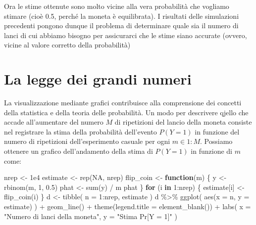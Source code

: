 \documentclass[
  11pt,
]{krantz}
\makeatletter
\newenvironment{Shaded}{\begin{snugshade}}{\end{snugshade}}
\newcommand{\AttributeTok}[1]{\textcolor[rgb]{0.61,0.61,0.61}{#1}}
\newcommand{\ConstantTok}[1]{\textcolor[rgb]{0,0,0}{#1}}
\newcommand{\ControlFlowTok}[1]{\textcolor[rgb]{0.27,0.27,0.27}{\textbf{#1}}}
\newcommand{\DecValTok}[1]{\textcolor[rgb]{0.06,0.06,0.06}{#1}}
\newcommand{\FloatTok}[1]{\textcolor[rgb]{0.06,0.06,0.06}{#1}}
\newcommand{\FunctionTok}[1]{\textcolor[rgb]{0,0,0}{#1}}
\newcommand{\NormalTok}[1]{#1}
\newcommand{\OtherTok}[1]{\textcolor[rgb]{0.37,0.37,0.37}{#1}}
\newcommand{\SpecialCharTok}[1]{\textcolor[rgb]{0,0,0}{#1}}
\newcommand{\StringTok}[1]{\textcolor[rgb]{0.5,0.5,0.5}{#1}}
\newenvironment{kframe}{%
\medskip{}
\setlength{\fboxsep}{.8em}
 \def\at@end@of@kframe{}%
 \ifinner\ifhmode%
  \def\at@end@of@kframe{\end{minipage}}%
  \begin{minipage}{\columnwidth}%
 \fi\fi%
 \def\FrameCommand##1{\hskip\@totalleftmargin \hskip-\fboxsep
 \colorbox{shadecolor}{##1}\hskip-\fboxsep
     \hskip-\linewidth \hskip-\@totalleftmargin \hskip\columnwidth}%
 \MakeFramed {\advance\hsize-\width
   \@totalleftmargin\z@ \linewidth\hsize
   \@setminipage}}%
 {\par\unskip\endMakeFramed%
 \at@end@of@kframe}
\renewenvironment{Shaded}{\begin{kframe}}{\end{kframe}}
\theoremstyle{definition}
\theoremstyle{definition}
\theoremstyle{definition}
\theoremstyle{definition}
\theoremstyle{remark}
\makeatother
\begin{document}
Ora le stime ottenute sono molto vicine alla vera probabilità che vogliamo stimare (cioè 0.5, perché la moneta è equilibrata). I risultati delle simulazioni precedenti pongono dunque il problema di determinare quale sia il numero di lanci di cui abbiamo bisogno per assicurarci che le stime siano accurate (ovvero, vicine al valore corretto della probabilità)

\hypertarget{la-legge-dei-grandi-numeri}{%
\section{La legge dei grandi numeri}\label{la-legge-dei-grandi-numeri}}

La visualizzazione mediante grafici contribuisce alla comprensione dei concetti della statistica e della teoria delle probabilità. Un modo per descrivere qjello che accade all'aumentare del numero \(M\) di ripetizioni del lancio della moneta consiste nel registrare la stima della probabilità dell'evento \(P(Y = 1)\) in funzione del numero di ripetizioni dell'esperimento casuale per ogni \(m \in 1:M\). Possiamo ottenere un grafico dell'andamento della stima di \(P(Y = 1)\) in funzione di \(m\) come:

\begin{Shaded}
\begin{Highlighting}[]
\NormalTok{nrep }\OtherTok{\textless{}{-}} \FloatTok{1e4}
\NormalTok{estimate }\OtherTok{\textless{}{-}} \FunctionTok{rep}\NormalTok{(}\ConstantTok{NA}\NormalTok{, nrep)}
\NormalTok{flip\_coin }\OtherTok{\textless{}{-}} \ControlFlowTok{function}\NormalTok{(m) \{}
\NormalTok{  y }\OtherTok{\textless{}{-}} \FunctionTok{rbinom}\NormalTok{(m, }\DecValTok{1}\NormalTok{, }\FloatTok{0.5}\NormalTok{)}
\NormalTok{  phat }\OtherTok{\textless{}{-}} \FunctionTok{sum}\NormalTok{(y) }\SpecialCharTok{/}\NormalTok{ m}
\NormalTok{  phat}
\NormalTok{\}}
\ControlFlowTok{for}\NormalTok{ (i }\ControlFlowTok{in} \DecValTok{1}\SpecialCharTok{:}\NormalTok{nrep) \{}
\NormalTok{  estimate[i] }\OtherTok{\textless{}{-}} \FunctionTok{flip\_coin}\NormalTok{(i)}
\NormalTok{\}}
\NormalTok{d }\OtherTok{\textless{}{-}} \FunctionTok{tibble}\NormalTok{(}
  \AttributeTok{n =} \DecValTok{1}\SpecialCharTok{:}\NormalTok{nrep,}
\NormalTok{  estimate}
\NormalTok{)}
\NormalTok{d }\SpecialCharTok{\%\textgreater{}\%}
  \FunctionTok{ggplot}\NormalTok{(}
    \FunctionTok{aes}\NormalTok{(}\AttributeTok{x =}\NormalTok{ n, }\AttributeTok{y =}\NormalTok{ estimate)}
\NormalTok{  ) }\SpecialCharTok{+}
  \FunctionTok{geom\_line}\NormalTok{() }\SpecialCharTok{+}
  \FunctionTok{theme}\NormalTok{(}\AttributeTok{legend.title =} \FunctionTok{element\_blank}\NormalTok{()) }\SpecialCharTok{+}
  \FunctionTok{labs}\NormalTok{(}
    \AttributeTok{x =} \StringTok{"Numero di lanci della moneta"}\NormalTok{,}
    \AttributeTok{y =} \StringTok{"Stima Pr[Y = 1]"}
\NormalTok{  )}
\end{Highlighting}
\end{Shaded}
\end{document}
